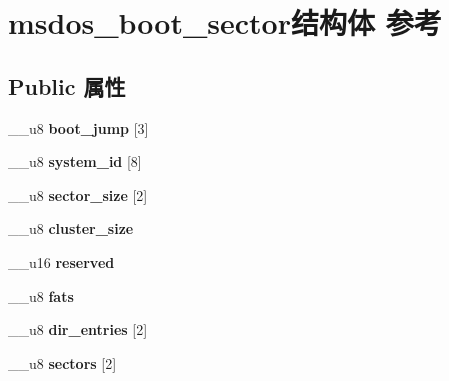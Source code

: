 \hypertarget{structmsdos__boot__sector}{}\section{msdos\+\_\+boot\+\_\+sector结构体 参考}
\label{structmsdos__boot__sector}
\subsection*{Public 属性}
\begin{DoxyCompactItemize}
\item 
\mbox{\label{structmsdos__boot__sector_afb08ba02508e2a92fcae81e40d9484a5}} 
\+\_\+\+\_\+u8 {\bfseries boot\+\_\+jump} \mbox{[}3\mbox{]}
\item 
\mbox{\label{structmsdos__boot__sector_aefc1b76323fc8ca67d31b7c18e32b222}} 
\+\_\+\+\_\+u8 {\bfseries system\+\_\+id} \mbox{[}8\mbox{]}
\item 
\mbox{\label{structmsdos__boot__sector_a50225e3a4a3b09fbc91fd23c8ee3378d}} 
\+\_\+\+\_\+u8 {\bfseries sector\+\_\+size} \mbox{[}2\mbox{]}
\item 
\mbox{\label{structmsdos__boot__sector_ad9a80793f1087e7ca1336eaa3778c413}} 
\+\_\+\+\_\+u8 {\bfseries cluster\+\_\+size}
\item 
\mbox{\label{structmsdos__boot__sector_a86d2e9c30d6d83757d5b5469147959b4}} 
\+\_\+\+\_\+u16 {\bfseries reserved}
\item 
\mbox{\label{structmsdos__boot__sector_a078a124314e3625034d3b17b2e33cc67}} 
\+\_\+\+\_\+u8 {\bfseries fats}
\item 
\mbox{\label{structmsdos__boot__sector_a8df97ee00a6a562c8efc731121edabaa}} 
\+\_\+\+\_\+u8 {\bfseries dir\+\_\+entries} \mbox{[}2\mbox{]}
\item 
\mbox{\label{structmsdos__boot__sector_afc9d4d3d9732359e5ff90471102496bb}} 
\+\_\+\+\_\+u8 {\bfseries sectors} \mbox{[}2\mbox{]}
\item 

\end{DoxyCompactItemize}
